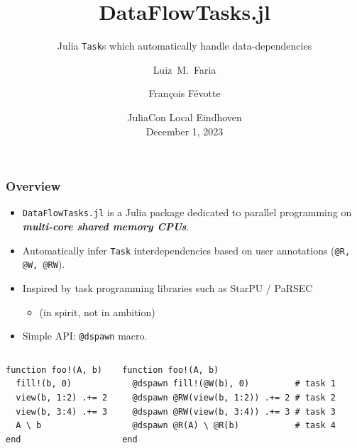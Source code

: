 \documentclass{beamer}
\title[DataFlowTasks] %
{DataFlowTasks.jl}
\subtitle{Julia \texttt{Task}s which automatically handle data-dependencies}
\author[Faria, Févotte] %
{Luiz~M.~Faria\inst{1} \and François Févotte\inst{2}}
\institute[]
{
    \inst{1}%
    Research scientist\\
    INRIA
    \and
    \inst{2}%
    Chief Scientist\\
    TriScale innov
}
\date{JuliaCon Local Eindhoven\\December 1, 2023}
\newcommand{\DFT}{\texttt{DataFlowTasks.jl}}
\begin{document}
\frame{\titlepage}

\begin{frame}[fragile]
\frametitle{Overview}

\begin{itemize}
    \item \DFT{} is a Julia package dedicated to parallel programming on
      \textit{\textbf{multi-core shared memory CPUs}}.
    \item Automatically infer \texttt{Task} interdependencies based on user annotations (\texttt{@R, @W, @RW}).
    \item Inspired by task programming libraries such as StarPU / PaRSEC
      \begin{itemize}
      \item (in spirit, not in ambition)
      \end{itemize}
    \item Simple API: \texttt{@dspawn} macro.
\end{itemize}
%
\begin{columns}[t]
\begin{exampleblock}{}
\begin{verbatim}
function foo!(A, b)
  fill!(b, 0)
  view(b, 1:2) .+= 2
  view(b, 3:4) .+= 3
  A \ b
end
\end{verbatim}
\end{exampleblock}
\center {}
 

\begin{exampleblock}{}
\begin{verbatim}
function foo!(A, b)
  @dspawn fill!(@W(b), 0)         # task 1
  @dspawn @RW(view(b, 1:2)) .+= 2 # task 2
  @dspawn @RW(view(b, 3:4)) .+= 3 # task 3
  @dspawn @R(A) \ @R(b)           # task 4
end
\end{verbatim}
\end{exampleblock}
\center {}

\end{columns}


\end{frame}
\end{document}

